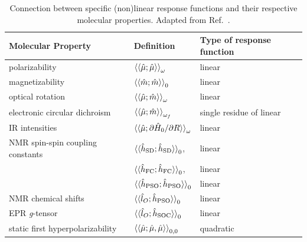 \documentclass[%
class = book,%
crop = false,%
float = true,%
multi = true,%
preview = false,%
]{standalone}
\begin{document}
\begin{table}
  \centering
  \caption[Connection between response functions and molecular properties]{Connection between specific (non)linear response functions and their respective molecular properties. Adapted from Ref.~\parencite{C1CP21951K}.\label{tab:norman}}
  \begin{tabular}{lll}
    \toprule
    \textbf{Molecular Property}       & \textbf{Definition}                                                                    & \textbf{Type of response function} \\
    \midrule
    polarizability                    & \( \braket{\braket{\hat{\mu};\hat{\mu}}}_{\omega} \)                                   & linear \\
    magnetizability                   & \( \braket{\braket{\hat{m};\hat{m}}}_{0} \)                                            & linear \\
    optical rotation                  & \( \braket{\braket{\hat{\mu};\hat{m}}}_{\omega} \)                                     & linear \\
    electronic circular dichroism     & \( \braket{\braket{\hat{\mu};\hat{m}}}_{\omega_{f}} \)                                 & single residue of linear \\
    IR intensities                    & \( \braket{\braket{\hat{\mu};\partial\hat{H}_{0}/\partial R}}_{\omega} \)              & linear \\
    NMR spin-spin coupling constants  & \( \braket{\braket{\hat{h}_{\text{SD}};\hat{h}_{\text{SD}}}}_{0} \),                   & linear \\
                                      & \( \braket{\braket{\hat{h}_{\text{FC}};\hat{h}_{\text{FC}}}}_{0} \),                   & linear \\
                                      & \( \braket{\braket{\hat{h}_{\text{PSO}};\hat{h}_{\text{PSO}}}}_{0} \)                  & linear \\
    NMR chemical shifts               & \( \braket{\braket{\hat{l}_{O};\hat{h}_{\text{PSO}}}}_{0} \)                           & linear \\
    EPR \textit{g}-tensor             & \( \braket{\braket{\hat{l}_{O};\hat{h}_{\text{SOC}}}}_{0} \)                           & linear \\
    \midrule
    static first hyperpolarizability  & \( \braket{\braket{\hat{\mu};\hat{\mu},\hat{\mu}}}_{0,0} \)                            & quadratic \\

\end{tabular}
\end{table}
\end{document}
